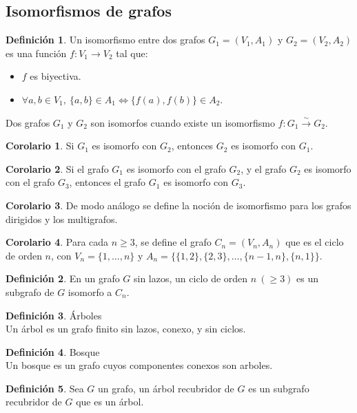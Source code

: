\documentclass[10pt]{article}
\theoremstyle{definition}
\newtheorem{definition}{Definición}[section]
\newtheorem{corollary}{Corolario}[theorem]
\begin{document}
\newpage\subsection{Isomorfismos de grafos}
\begin{definition}
	Un isomorfismo entre dos grafos $G_1=(V_1,A_1)$ y $G_2=(V_2,A_2)$ es una función $f:V_1\to V_2$ tal que:
	\begin{itemize}
		\item $f$ es biyectiva.
		\item $\forall a,b\in V_1,\ \{a,b\}\in A_1\Leftrightarrow\{f(a),f(b)\}\in A_2$.
	\end{itemize}
	Dos grafos $G_1$ y $G_2$ son isomorfos cuando existe un isomorfismo $f:G_1\xrightarrow{\sim} G_2$.
\end{definition}
\begin{corollary}
	Si $G_1$ es isomorfo con $G_2$, entonces $G_2$ es isomorfo con $G_1$.
\end{corollary}
\begin{corollary}
	Si el grafo $G_1$ es isomorfo con el grafo $G_2$, y el grafo $G_2$ es isomorfo con el grafo $G_3$, entonces el grafo $G_1$ es isomorfo con $G_3$.
\end{corollary}
\begin{corollary}
	De modo análogo se define la noción de isomorfismo para los grafos dirigidos y los multigrafos.
\end{corollary}
\begin{corollary}
	Para cada $n\ge 3$, se define el grafo $C_n=(V_n,A_n)$ que es el ciclo de orden $n$, con $V_n=\{1,\dots,n\}$ y $A_n=\{\{1,2\},\{2,3\},\dots,\{n-1,n\},\{n,1\}\}$.
\end{corollary}
\begin{definition}
	En un grafo $G$ sin lazos, un ciclo de orden $n\ (\ge 3)$ es un subgrafo de $G$ isomorfo a $C_n$.
\end{definition}
\begin{definition}{Árboles}
	\\Un árbol es un grafo finito sin lazos, conexo, y sin ciclos.
\end{definition}
\begin{definition}{Bosque}
	\\Un bosque es un grafo cuyos componentes conexos son arboles.
\end{definition}
\begin{definition}
	Sea $G$ un grafo, un árbol recubridor de $G$ es un subgrafo recubridor de $G$ que es un árbol.
\end{definition}
\end{document}

